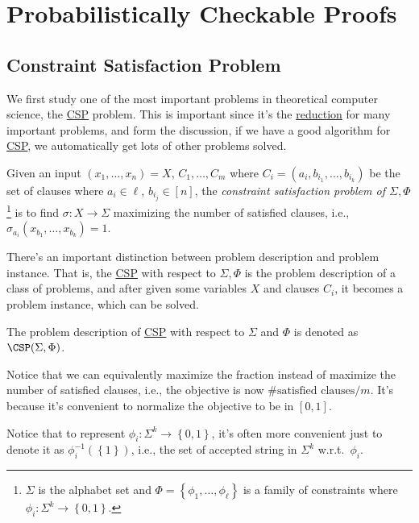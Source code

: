 \section{Probabilistically Checkable Proofs}
\subsection{Constraint Satisfaction Problem}
We first study one of the most important problems in theoretical computer science, the \hyperref[prb:CSP]{CSP} problem. This is important since it's the \hyperref[def:reduction]{reduction} for many important problems, and form the discussion, if we have a good algorithm for \hyperref[prb:CSP]{CSP}, we automatically get lots of other problems solved.

\begin{problem}[CSP]\label{prb:CSP}
Given an input \((x_1, \dots , x_n) = X\), \(C_1, \dots  , C_m\) where \(C_i = (a_i, b_{i_1}, \dots , b_{i_k})\) be the set of clauses where \(a_i\in {\ell }\), \(b_{i_j}\in [n]\), the \emph{constraint satisfaction problem of \(\Sigma, \Phi \)}\footnote{\(\Sigma \) is the alphabet set and \(\Phi = \left\{ \phi _1, \dots , \phi _{\ell }  \right\} \) is a family of constraints where \(\phi _i \colon \Sigma ^k \to \left\{ 0, 1 \right\} \).} is to find \(\sigma \colon X\to \Sigma \) maximizing the number of satisfied clauses, i.e., \(\sigma _{a_i}(x_{b_1},\dots , x_{b_k} )=1\).
\end{problem}

There's an important distinction between problem description and problem instance. That is, the \hyperref[prb:CSP]{CSP} with respect to \(\Sigma, \Phi \) is the problem description of a class of problems, and after given some variables \(X\) and clauses \(C_i\), it becomes a problem instance, which can be solved.

\begin{notation}
	The problem description of \hyperref[prb:CSP]{CSP} with respect to \(\Sigma \) and \(\Phi \) is denoted as \(\CSP(\Sigma , \Phi )\).
\end{notation}

Notice that we can equivalently maximize the fraction instead of maximize the number of satisfied clauses, i.e., the objective is now \(\#\text{satisfied clauses} / m \). It's because it's convenient to normalize the objective to be in \([0, 1]\).

\begin{note}
	Notice that to represent \(\phi _i \colon \Sigma ^k \to \left\{ 0, 1 \right\} \), it's often more convenient just to denote it as \(\phi _i ^{-1} (\left\{ 1 \right\} )\), i.e., the set of accepted string in \(\Sigma ^k\) w.r.t.\ \(\phi _i\).
\end{note}

